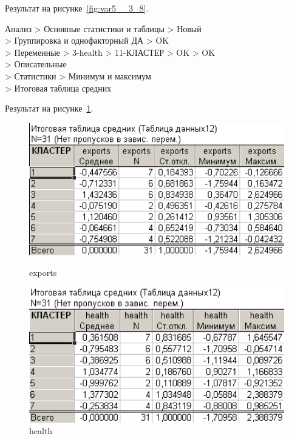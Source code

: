 Результат на рисунке~\ref{fig:var5__3_8}.

\newpage

Анализ > Основные статистики и таблицы > Новый\\
> Группировка и однофакторный ДА > OK\\
> Переменные > 3-health > 11-КЛАСТЕР > OK > OK\\
> Описательные\\
> Статистики > Минимум и максимум\\
> Итоговая таблица средних

Результат на рисунке~\ref{fig:var5__3_9}.

\begin{figure}[!h]
  \centering
  \begin{minipage}{0.49\textwidth}
    \centering

    \includegraphics[width=0.99\textwidth]
    {inc/cars_my/var5__3_8.PNG}

    \caption{exports}
    \label{fig:var5__3_8}
  \end{minipage}
  \begin{minipage}{0.49\textwidth}
    \centering

    \includegraphics[width=0.99\textwidth]
    {inc/cars_my/var5__3_9.PNG}

    \caption{health}
    \label{fig:var5__3_9}
  \end{minipage}
\end{figure}


